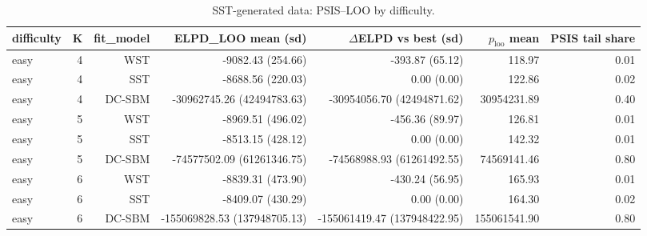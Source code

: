\begin{table}[!h]
\centering
\caption{SST-generated data: PSIS–LOO by difficulty.\\\label{tab:sst-appx-diff-psis-loo}}
\centering
\begin{tabular}[t]{lrrrrrr}
\toprule
difficulty & K & fit_model & ELPD\_LOO mean (sd) & $\Delta$ELPD vs best (sd) & $p_{\text{loo}}$ mean & PSIS tail share\\
\midrule
easy & 4 & WST & -9082.43 (254.66) & -393.87 (65.12) & 118.97 & 0.01\\
easy & 4 & SST & -8688.56 (220.03) & 0.00 (0.00) & 122.86 & 0.02\\
easy & 4 & DC-SBM & -30962745.26 (42494783.63) & -30954056.70 (42494871.62) & 30954231.89 & 0.40\\
easy & 5 & WST & -8969.51 (496.02) & -456.36 (89.97) & 126.81 & 0.01\\
easy & 5 & SST & -8513.15 (428.12) & 0.00 (0.00) & 142.32 & 0.01\\
easy & 5 & DC-SBM & -74577502.09 (61261346.75) & -74568988.93 (61261492.55) & 74569141.46 & 0.80\\
easy & 6 & WST & -8839.31 (473.90) & -430.24 (56.95) & 165.93 & 0.01\\
easy & 6 & SST & -8409.07 (430.29) & 0.00 (0.00) & 164.30 & 0.02\\
easy & 6 & DC-SBM & -155069828.53 (137948705.13) & -155061419.47 (137948422.95) & 155061541.90 & 0.80\\
\bottomrule
\end{tabular}
\end{table}
